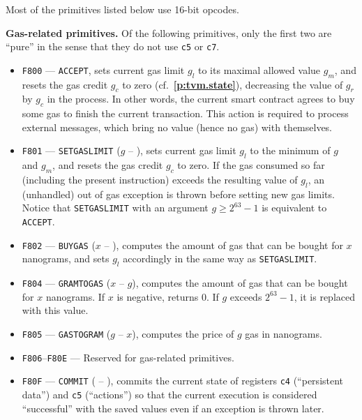 \documentclass[12pt,oneside]{article}
\def\makepoint#1{\medbreak\noindent{\bf #1.\ }}
\def\nxsubpoint{\refstepcounter{subsubsection}%
    \smallbreak\makepoint{\thesubsubsection}}
\def\refpoint#1{{\rm\textbf{\ref{#1}}}}
\let\ptref=\refpoint
\def\emb#1{\textbf{#1.}}
\begin{document}
Most of the primitives listed below use 16-bit opcodes.

\nxsubpoint\emb{Gas-related primitives}
Of the following primitives, only the first two are ``pure'' in the sense that they do not use {\tt c5} or {\tt c7}.
\begin{itemize}
\item {\tt F800} --- {\tt ACCEPT}, sets current gas limit $g_l$ to its maximal allowed value $g_m$, and resets the gas credit $g_c$ to zero (cf.~\ptref{p:tvm.state}), decreasing the value of $g_r$ by $g_c$ in the process. In other words, the current smart contract agrees to buy some gas to finish the current transaction. This action is required to process external messages, which bring no value (hence no gas) with themselves.
\item {\tt F801} --- {\tt SETGASLIMIT} ($g$ -- ), sets current gas limit $g_l$ to the minimum of $g$ and $g_m$, and resets the gas credit $g_c$ to zero. If the gas consumed so far (including the present instruction) exceeds the resulting value of $g_l$, an (unhandled) out of gas exception is thrown before setting new gas limits. Notice that {\tt SETGASLIMIT} with an argument $g\geq 2^{63}-1$ is equivalent to {\tt ACCEPT}.
\item {\tt F802} --- {\tt BUYGAS} ($x$ -- ), computes the amount of gas that can be bought for $x$ nanograms, and sets $g_l$ accordingly in the same way as {\tt SETGASLIMIT}.
\item {\tt F804} --- {\tt GRAMTOGAS} ($x$ -- $g$), computes the amount of gas that can be bought for $x$ nanograms. If $x$ is negative, returns 0. If $g$ exceeds $2^{63}-1$, it is replaced with this value.
\item {\tt F805} --- {\tt GASTOGRAM} ($g$ -- $x$), computes the price of $g$ gas in nanograms.
\item {\tt F806}--{\tt F80E} --- Reserved for gas-related primitives.
\item {\tt F80F} --- {\tt COMMIT} ( -- ), commits the current state of registers {\tt c4} (``persistent data'') and {\tt c5} (``actions'') so that the current execution is considered ``successful'' with the saved values even if an exception is thrown later.
\end{itemize}
\end{document}

